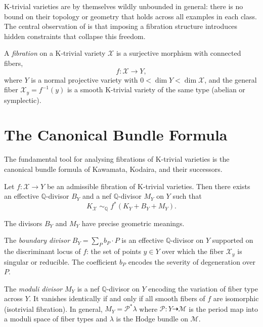 \documentclass[11pt,openany]{book}
\begin{document}
K-trivial varieties are by themselves wildly unbounded in
general: there is no bound on their topology or geometry
that holds across all examples in each class.  The central
observation of \citep{engel2025} is that imposing a
fibration structure introduces hidden constraints that
collapse this freedom.

\begin{definition}
A \emph{fibration} on a K-trivial variety $\mathcal{X}$ is
a surjective morphism with connected fibers,
\[
  f : \mathcal{X} \to Y,
\]
where $Y$ is a normal projective variety with
$0 < \dim Y < \dim \mathcal{X}$, and the general fiber
$\mathcal{X}_y = f^{-1}(y)$ is a smooth K-trivial variety
of the same type (abelian or symplectic).
\end{definition}

\section{The Canonical Bundle Formula}
\label{sec:canonical-bundle-formula}

The fundamental tool for analysing fibrations of K-trivial
varieties is the canonical bundle formula of Kawamata,
Kodaira, and their successors.

\begin{theorem}
\label{thm:canonical-bundle-formula}
Let $f : \mathcal{X} \to Y$ be an admissible fibration of
K-trivial varieties.  Then there exists an effective
$\mathbb{Q}$-divisor $B_Y$ and a nef $\mathbb{Q}$-divisor
$M_Y$ on $Y$ such that
\[
  K_{\mathcal{X}} \;\sim_{\mathbb{Q}}\;
    f^*\!\left(K_Y + B_Y + M_Y\right).
\]
\end{theorem}

The divisors $B_Y$ and $M_Y$ have precise geometric
meanings.

\begin{definition}
The \emph{boundary divisor} $B_Y = \sum_P b_P \cdot P$ is
an effective $\mathbb{Q}$-divisor on $Y$ supported on the
discriminant locus of $f$: the set of points $y \in Y$
over which the fiber $\mathcal{X}_y$ is singular or
reducible.  The coefficient $b_P$ encodes the severity of
degeneration over $P$.
\end{definition}

\begin{definition}
The \emph{moduli divisor} $M_Y$ is a nef
$\mathbb{Q}$-divisor on $Y$ encoding the variation of
fiber type across $Y$.  It vanishes identically if and
only if all smooth fibers of $f$ are isomorphic
(isotrivial fibration).  In general, $M_Y = \mathcal{P}^*
\lambda$ where $\mathcal{P} : Y \dashrightarrow \mathcal{M}$
is the period map into a moduli space of fiber types and
$\lambda$ is the Hodge bundle on $\mathcal{M}$.
\end{definition}
\end{document}
